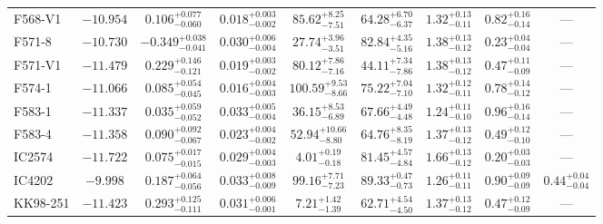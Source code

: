 \documentclass[twocolumn,tighten]{aastex63}
\begin{document}
\begin{table}
\begin{center}
\begin{tabular}{lcccccccc}
    F568-V1 & $ -10.954 $ & $ 0.106 _{ -0.060 } ^{ + 0.077 } $ & $ 0.018 _{ -0.002 } ^{ + 0.003 } $ & $ 85.62 _{ -7.51 } ^{ + 8.25 } $ & $ 64.28 _{ -6.37 } ^{ + 6.70 } $ & $ 1.32 _{ -0.11 } ^{ + 0.13 } $ & $ 0.82 _{ -0.14 } ^{ + 0.16 } $ & --- \\  
     F571-8 & $ -10.730 $ & $ -0.349 _{ -0.041 } ^{ + 0.038 } $ & $ 0.030 _{ -0.004 } ^{ + 0.006 } $ & $ 27.74 _{ -3.51 } ^{ + 3.96 } $ & $ 82.84 _{ -5.16 } ^{ + 4.35 } $ & $ 1.38 _{ -0.12 } ^{ + 0.13 } $ & $ 0.23 _{ -0.04 } ^{ + 0.04 } $ & --- \\  
    F571-V1 & $ -11.479 $ & $ 0.229 _{ -0.121 } ^{ + 0.146 } $ & $ 0.019 _{ -0.002 } ^{ + 0.003 } $ & $ 80.12 _{ -7.16 } ^{ + 7.86 } $ & $ 44.11 _{ -7.86 } ^{ + 7.34 } $ & $ 1.38 _{ -0.12 } ^{ + 0.13 } $ & $ 0.47 _{ -0.09 } ^{ + 0.11 } $ & --- \\  
     F574-1 & $ -11.066 $ & $ 0.085 _{ -0.045 } ^{ + 0.054 } $ & $ 0.016 _{ -0.003 } ^{ + 0.004 } $ & $ 100.59 _{ -8.66 } ^{ + 9.53 } $ & $ 75.22 _{ -7.10 } ^{ + 7.04 } $ & $ 1.32 _{ -0.11 } ^{ + 0.12 } $ & $ 0.78 _{ -0.12 } ^{ + 0.14 } $ & --- \\  
     F583-1 & $ -11.337 $ & $ 0.035 _{ -0.052 } ^{ + 0.059 } $ & $ 0.033 _{ -0.004 } ^{ + 0.005 } $ & $ 36.15 _{ -6.89 } ^{ + 8.53 } $ & $ 67.66 _{ -4.48 } ^{ + 4.49 } $ & $ 1.24 _{ -0.10 } ^{ + 0.11 } $ & $ 0.96 _{ -0.14 } ^{ + 0.16 } $ & --- \\  
     F583-4 & $ -11.358 $ & $ 0.090 _{ -0.067 } ^{ + 0.092 } $ & $ 0.023 _{ -0.002 } ^{ + 0.004 } $ & $ 52.94 _{ -8.80 } ^{ + 10.66 } $ & $ 64.76 _{ -8.19 } ^{ + 8.35 } $ & $ 1.37 _{ -0.12 } ^{ + 0.13 } $ & $ 0.49 _{ -0.10 } ^{ + 0.12 } $ & --- \\  
     IC2574 & $ -11.722 $ & $ 0.075 _{ -0.015 } ^{ + 0.017 } $ & $ 0.029 _{ -0.003 } ^{ + 0.004 } $ & $ 4.01 _{ -0.18 } ^{ + 0.19 } $ & $ 81.45 _{ -4.84 } ^{ + 4.57 } $ & $ 1.66 _{ -0.12 } ^{ + 0.13 } $ & $ 0.20 _{ -0.03 } ^{ + 0.03 } $ & --- \\  
     IC4202 & $ -9.998  $ & $ 0.187 _{ -0.056 } ^{ + 0.064 } $ & $ 0.033 _{ -0.009 } ^{ + 0.008 } $ & $ 99.16 _{ -7.23 } ^{ + 7.71 } $ & $ 89.33 _{ -0.73 } ^{ + 0.47 } $ & $ 1.26 _{ -0.11 } ^{ + 0.11 } $ & $ 0.90 _{ -0.09 } ^{ + 0.09 } $ & $ 0.44 _{ -0.04 } ^{ + 0.04 } $  \\  
   KK98-251 & $ -11.423 $ & $ 0.293 _{ -0.111 } ^{ + 0.125 } $ & $ 0.031 _{ -0.001 } ^{ + 0.006 } $ & $ 7.21 _{ -1.39 } ^{ + 1.42 } $ & $ 62.71 _{ -4.50 } ^{ + 4.54 } $ & $ 1.37 _{ -0.12 } ^{ + 0.13 } $ & $ 0.47 _{ -0.09 } ^{ + 0.12 } $ & --- \\  

\end{tabular}
\end{center}
\end{table}
\end{document}
